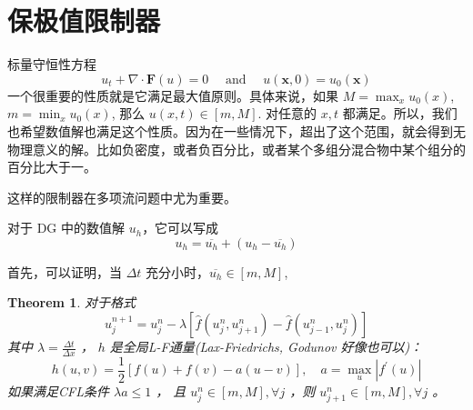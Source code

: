 \documentclass{article}
\newtheorem{theorem}{Theorem}
\numberwithin{equation}{subsection}    %
\begin{document}
\section{保极值限制器}
标量守恒性方程
\begin{equation}
    u_{t}+\nabla \cdot \mathbf{F}(u)=0 \quad \text { and } \quad u(\mathbf{x}, 0)=u_{0}(\mathbf{x})
\end{equation}
一个很重要的性质就是它满足最大值原则。具体来说，如果 $M=\max_x u_0(x)$,$m=\min_x u_0(x)$, 那么 $u(x,t)\in[m,M]$. 对任意的 $x,t$ 都满足。所以，我们也希望数值解也满足这个性质。因为在一些情况下，超出了这个范围，就会得到无物理意义的解。比如负密度，或者负百分比，或者某个多组分混合物中某个组分的百分比大于一。

这样的限制器在多项流问题中尤为重要。

对于 DG 中的数值解 $u_h$，它可以写成
\begin{equation}
    u_{h}=\overline{u_h}+(u_h-\overline{u_h})
\end{equation}

首先，可以证明，当 $\Delta t$ 充分小时，$\overline{u_h}\in[m,M]$,

\begin{theorem}
    对于格式
    \begin{equation}
        u_j^{n+1} = u_j^n - \lambda\left[\hat{f}(u_j^n,u_{j+1}^n)-\hat{f}(u_{j-1}^n,u_j^n)\right]
    \end{equation}
    其中  $\lambda=\frac{\Delta t}{\Delta x}$ ， $h$  是全局L-F通量(Lax-Friedrichs, Godunov 好像也可以)：
    \begin{equation}
        h(u, v)=\frac{1}{2}[f(u)+f(v)-a(u-v)], \quad a=\max _{u}\left|f^{\prime}(u)\right|
    \end{equation}
    如果满足CFL条件  $\lambda a \leq 1$  ， 且  $u_{j}^{n} \in[m, M], \forall j$ ，则  $u_{j+1}^{n} \in[m, M], \forall j$  。
\end{theorem}
\end{document}
